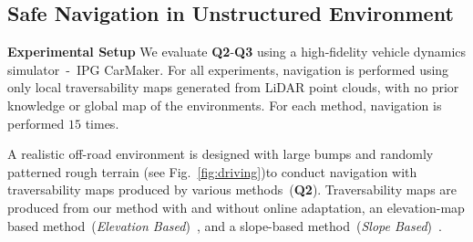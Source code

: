\subsection{Safe Navigation in Unstructured Environment}

\textbf{Experimental Setup}
We evaluate \textbf{Q2}-\textbf{Q3} using a high-fidelity vehicle dynamics simulator~-~IPG CarMaker. For all experiments, navigation is performed using only local traversability maps generated from LiDAR point clouds, with no prior knowledge or global map of the environments. For each method, navigation is performed $15$ times.

A realistic off-road environment is designed with large bumps and randomly patterned rough terrain (see Fig.~\ref{fig:driving})to conduct navigation with traversability maps produced by various methods~(\textbf{Q2}). Traversability maps are produced from our method with and without online adaptation, an elevation-map based method~(\textit{Elevation Based})~\cite{fankhauser2014robot,miki2022elevation}, and a slope-based method~(\textit{Slope Based})~\cite{sock2016probabilistic,kim2017traversable}.

\begin{table}[b]
\vspace*{-0.1in}
\centering
\small
\renewcommand {\arraystretch}{1.15}
\caption{The average and maximum motions of the vehicle across all trials.}
\label{table:safe}
\end{table}

